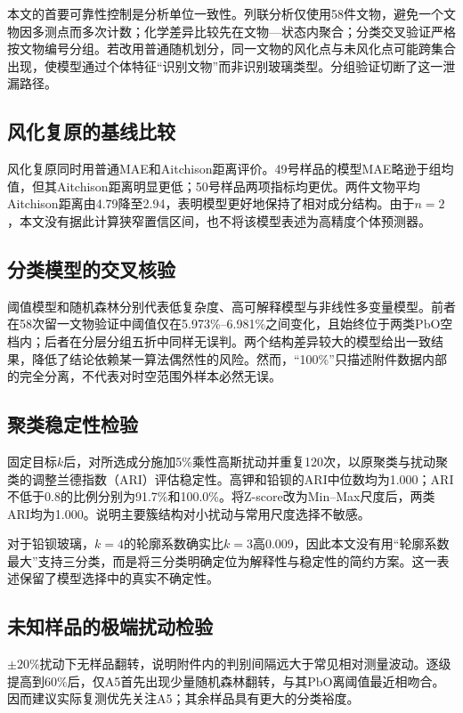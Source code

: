 \documentclass[UTF8,a4paper,zihao=-4,fontset=windows]{ctexart}
\begin{document}
本文的首要可靠性控制是分析单位一致性。列联分析仅使用58件文物，避免一个文物因多测点而多次计数；化学差异比较先在文物—状态内聚合；分类交叉验证严格按文物编号分组。若改用普通随机划分，同一文物的风化点与未风化点可能跨集合出现，使模型通过个体特征“识别文物”而非识别玻璃类型。分组验证切断了这一泄漏路径。

\subsection{风化复原的基线比较}

风化复原同时用普通MAE和Aitchison距离评价。49号样品的模型MAE略逊于组均值，但其Aitchison距离明显更低；50号样品两项指标均更优。两件文物平均Aitchison距离由4.79降至2.94，表明模型更好地保持了相对成分结构。由于$n=2$，本文没有据此计算狭窄置信区间，也不将该模型表述为高精度个体预测器。

\subsection{分类模型的交叉核验}

阈值模型和随机森林分别代表低复杂度、高可解释模型与非线性多变量模型。前者在58次留一文物验证中阈值仅在5.973\%--6.981\%之间变化，且始终位于两类$\mathrm{PbO}$空档内；后者在分层分组五折中同样无误判。两个结构差异较大的模型给出一致结果，降低了结论依赖某一算法偶然性的风险。然而，“100\%”只描述附件数据内部的完全分离，不代表对时空范围外样本必然无误。

\subsection{聚类稳定性检验}

固定目标$k$后，对所选成分施加5\%乘性高斯扰动并重复120次，以原聚类与扰动聚类的调整兰德指数（ARI）评估稳定性。高钾和铅钡的ARI中位数均为1.000；ARI不低于0.8的比例分别为91.7\%和100.0\%。将Z-score改为Min--Max尺度后，两类ARI均为1.000。说明主要簇结构对小扰动与常用尺度选择不敏感。

对于铅钡玻璃，$k=4$的轮廓系数确实比$k=3$高0.009，因此本文没有用“轮廓系数最大”支持三分类，而是将三分类明确定位为解释性与稳定性的简约方案。这一表述保留了模型选择中的真实不确定性。

\subsection{未知样品的极端扰动检验}

$\pm20\%$扰动下无样品翻转，说明附件内的判别间隔远大于常见相对测量波动。逐级提高到60\%后，仅A5首先出现少量随机森林翻转，与其$\mathrm{PbO}$离阈值最近相吻合。因而建议实际复测优先关注A5；其余样品具有更大的分类裕度。
\end{document}
